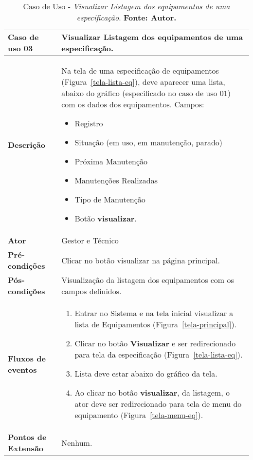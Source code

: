 \begin{apendicesenv}

\begin{table}[H]
\centering
\caption{Caso de Uso - \textit{Visualizar Listagem dos equipamentos de uma especificação}. \textbf{Fonte: Autor.}}
\label{uc03}
\begin{tabular}{ | p{5cm} | p{10cm} |  }
\hline
	\textbf{Caso de uso 03} & Visualizar Listagem dos equipamentos de uma especificação. \\ \hline
	\textbf{Descrição} & Na tela de uma especificação de equipamentos (Figura~\ref{tela-lista-eq}), deve aparecer uma lista, abaixo do gráfico (especificado no caso de uso 01) com os dados dos equipamentos. Campos: \begin{itemize}
															                    \item Registro
															                    \item Situação (em uso, em manutenção, parado) 
															                    \item Próxima Manutenção 
															                    \item Manutenções Realizadas 
															                    \item Tipo de Manutenção
															                    \item Botão \textbf{visualizar}. 
															                    \end{itemize} \\ \hline
	\textbf{Ator} & Gestor e Técnico \\ \hline
	\textbf{Pré-condições} & Clicar no botão visualizar na página principal. \\ \hline
	\textbf{Pós-condições} & Visualização da listagem dos equipamentos com os campos definidos. \\ \hline
	\textbf{Fluxos de eventos} & \begin{enumerate}
									\item Entrar no Sistema e na tela inicial visualizar a lista de Equipamentos (Figura~\ref{tela-principal}).    
									\item Clicar no botão \textbf{Visualizar} e ser redirecionado para tela da especificação (Figura~\ref{tela-lista-eq}).  
							        \item Lista deve estar abaixo do gráfico da tela.
							        \item Ao clicar no botão \textbf{visualizar}, da listagem, o ator deve ser redirecionado para tela de menu do equipamento (Figura~\ref{tela-menu-eq}).
								 \end{enumerate}   \\ \hline
	\textbf{Pontos de Extensão} & Nenhum. \\ \hline
\end{tabular}
\end{table}


\end{apendicesenv}
